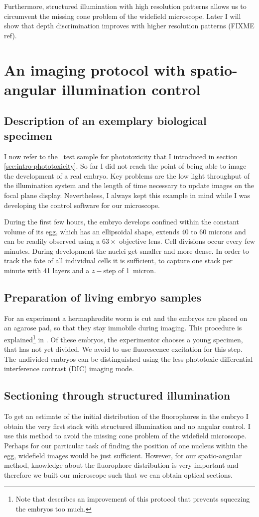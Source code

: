 Furthermore, structured illumination with high resolution patterns
allows us to circumvent the missing cone problem of the widefield
microscope.  Later I will show that depth discrimination improves with
higher resolution patterns (FIXME ref).
\section{An imaging protocol with spatio-angular illumination control}
\subsection{Description of an exemplary biological specimen} 
I now refer to the \celegans\ test sample for phototoxicity that I
introduced in section \ref{sec:intro-phototoxicity}. So far I did not
reach the point of being able to image the development of a real
embryo. Key problems are the low light throughput of the illumination
system and the length of time necessary to update images on the focal
plane display. Nevertheless, I always kept this example in mind while
I was developing the control software for our microscope.

During the first few hours, the embryo develops confined within the
constant volume of its egg, which has an ellipsoidal shape, extends 40
to 60 microns and can be readily observed using a $63\times$ objective
lens. Cell divisions occur every few minutes.  During development the
nuclei get smaller and more dense. In order to track the fate of all
individual cells it is sufficient, to capture one stack per minute
with 41 layers and a $z-$step of 1~micron.
\subsection{Preparation of living embryo samples} 
For an experiment a hermaphrodite worm is cut and the embryos are
placed on an agarose pad, so that they stay immobile during
imaging. This procedure is explained\footnote{Note that
  \cite{Murray2006} describes an improvement of this protocol that
  prevents squeezing the embryos too much.} in \cite{Hope1999}. Of
these embryos, the experimentor chooses a young specimen, that has not
yet divided. We avoid to use fluorescence excitation for this step.
The undivided embryos can be distinguished using the less phototoxic
differential interference contrast (DIC) imaging mode.

\subsection{Sectioning through structured illumination} 
To get an estimate of the initial distribution of the fluorophores in
the embryo I obtain the very first stack with structured illumination
and no angular control. I use this method to avoid the missing cone
problem of the widefield microscope. Perhaps for our particular task
of finding the position of one nucleus within the egg, widefield
images would be just sufficient.  However, for our spatio-angular
method, knowledge about the fluorophore distribution is very important
and therefore we built our microscope such that we can obtain optical
sections.

